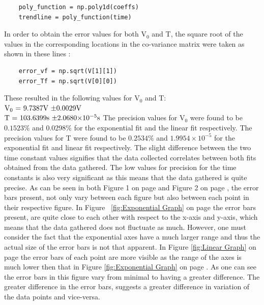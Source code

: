 \documentclass[12pt, a4paper]{article}
\begin{document}
\begin{verbatim}
    poly_function = np.poly1d(coeffs)
    trendline = poly_function(time)
\end{verbatim}
In order to obtain the error values for both $\text{V}_0$ and T, the square root of the values in the corresponding locations in the co-variance matrix were taken as shown in these lines :
\begin{verbatim}
    error_vf = np.sqrt(V[1][1])
    error_Tf = np.sqrt(V[0][0])
\end{verbatim}
These resulted in the following values for $\text{V}_0$ and T:\\
\indent $\text{V}_0 \text{ = 9.7387V \textpm 0.0029V}$\\
\indent $\text{T} \text{ = 103.6399s \textpm 2.0680}{\times}10^{-5}\text{s}$
\smallbreak
\noindent The precision values for $\text{V}_0$ were found to be $0.1523\%$ and 0.0298\% for the exponential fit and the linear fit respectively. The precision values for T were found to be $0.2534\%$ and $1.9954{\times} 10^{-5}$ for the exponential fit and linear fit respectively. The slight difference between the two time constant values signifies that the data collected correlates between both fits obtained from the data gathered. The low values for precision for the time constants is also very significant as this means that the data gathered is quite precise.
\smallbreak
\noindent As can be seen in both Figure 1 on page \pageref{fig:Exponential Graph} and Figure 2 on page \pageref{fig:Linear Graph}, the error bars present, not only vary between each figure but also between each point in their respective figure. In Figure ~\ref{fig:Exponential Graph} on page \pageref{fig:Exponential Graph} the error bars present, are quite close to each other with respect to the x-axis and y-axis, which means that the data gathered does not fluctuate as much. However, one must consider the fact that the exponential axes have a much larger range and thus the actual size of the error bars is not that apparent. In Figure \ref{fig:Linear Graph} on page \pageref{fig:Linear Graph} the error bars of each point are more visible as the range of the axes is much lower then that in Figure \ref{fig:Exponential Graph} on page \pageref{fig:Exponential Graph}. As one can see the error bars in this figure vary from minimal to having a greater difference. The greater difference in the error bars, suggests a greater difference in variation of the data points and vice-versa. 

\printbibliography[title = {References:}]
\end{document}
